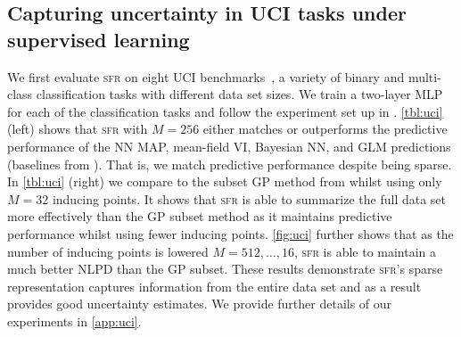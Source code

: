 \documentclass{article}
\newcommand{\our}{\textsc{sfr}\xspace}
\begin{document}
\subsection{Capturing uncertainty in UCI tasks under supervised learning}
\label{sec:uci}
%
We first evaluate \our on eight UCI benchmarks~\cite{UCI}, a variety of binary and multi-class classification tasks with different data set sizes.
We train a two-layer MLP for each of the classification tasks and follow the experiment set up in \cite{immer2021improving}.
\cref{tbl:uci} (left) shows that \our with $M=256$ either matches or outperforms the predictive performance of the NN MAP, mean-field VI, Bayesian NN, and GLM
predictions %
(baselines from \cite{immer2021improving}).
That is, we match predictive performance despite being sparse.
%
In \cref{tbl:uci} (right) we compare to the subset GP method from \cite{immer2021improving} whilst using only $M=32$ inducing points.
It shows that \our is able to summarize the full data set more effectively than the GP subset method as it maintains predictive performance
whilst using fewer inducing points.
\cref{fig:uci} further shows that as the number of inducing points is lowered $M=512,\ldots, 16$, \our is able to maintain a much better NLPD than the GP subset.
These results demonstrate \our's sparse representation captures information from the entire data set and as a result provides good uncertainty estimates.
We provide further details of our experiments in \cref{app:uci}.



\end{document}
